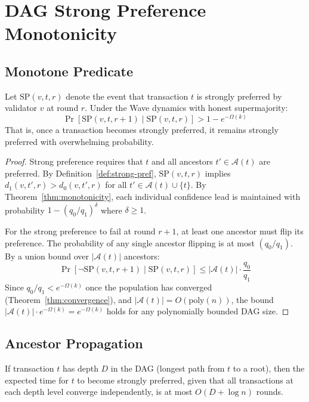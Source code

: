 \section{DAG Strong Preference Monotonicity}

\label{sec:dag}

\subsection{Monotone Predicate}

\begin{theorem}
\label{thm:dag-monotone}
Let $\text{SP}(v, t, r)$ denote the event that transaction $t$ is strongly preferred
by validator $v$ at round $r$. Under the Wave dynamics with honest supermajority:
\[
\Pr[\text{SP}(v, t, r+1) \mid \text{SP}(v, t, r)] > 1 - e^{-\Omega(k)}
\]
That is, once a transaction becomes strongly preferred, it remains strongly preferred
with overwhelming probability.
\end{theorem}

\begin{proof}
Strong preference requires that $t$ and all ancestors $t' \in \mathcal{A}(t)$ are preferred.
By Definition~\ref{def:strong-pref}, $\text{SP}(v, t, r)$ implies $d_1(v, t', r) > d_0(v, t', r)$
for all $t' \in \mathcal{A}(t) \cup \{t\}$. By Theorem~\ref{thm:monotonicity}, each individual
confidence lead is maintained with probability $1 - (q_0/q_1)^{\delta}$ where $\delta \geq 1$.

For the strong preference to fail at round $r+1$, at least one ancestor must flip its
preference. The probability of any single ancestor flipping is at most $(q_0/q_1)$.
By a union bound over $|\mathcal{A}(t)|$ ancestors:
\[
\Pr[\lnot \text{SP}(v, t, r+1) \mid \text{SP}(v, t, r)] \leq |\mathcal{A}(t)| \cdot \frac{q_0}{q_1}
\]
Since $q_0/q_1 < e^{-\Omega(k)}$ once the population has converged (Theorem~\ref{thm:convergence}),
and $|\mathcal{A}(t)| = O(\text{poly}(n))$, the bound $|\mathcal{A}(t)| \cdot e^{-\Omega(k)} = e^{-\Omega(k)}$
holds for any polynomially bounded DAG size.
\end{proof}

\subsection{Ancestor Propagation}

\begin{lemma}
\label{lem:propagation}
If transaction $t$ has depth $D$ in the DAG (longest path from $t$ to a root), then the
expected time for $t$ to become strongly preferred, given that all transactions at each
depth level converge independently, is at most $O(D + \log n)$ rounds.
\end{lemma}


